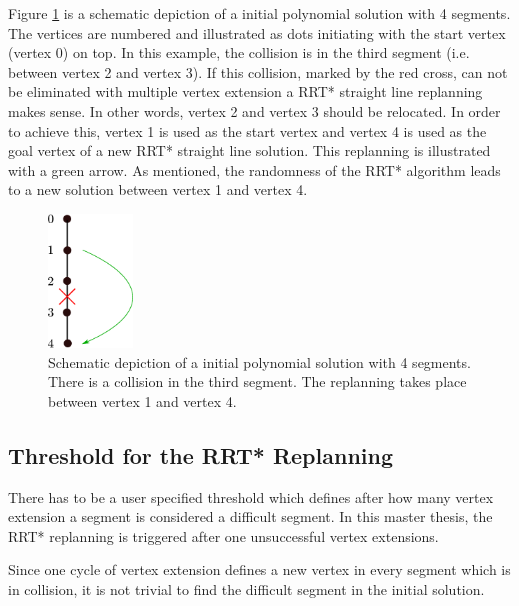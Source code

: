Figure \ref{pic:vertexExtensionRRT} is a schematic depiction of a initial polynomial solution with 4 segments. The vertices are numbered and illustrated as dots initiating with the start vertex (vertex 0) on top. In this example, the collision is in the third segment (i.e. between vertex 2 and vertex 3). If this collision, marked by the red cross, can not be eliminated with multiple vertex extension a RRT* straight line replanning makes sense. In other words, vertex 2 and vertex 3 should be relocated. 
In order to achieve this, vertex 1 is used as the start vertex and vertex 4 is used as the goal vertex of a new RRT* straight line solution. This replanning is illustrated with a green arrow. As mentioned, the randomness of the RRT* algorithm leads to a new solution between vertex 1 and vertex 4.


\begin{figure}[h]
   \centering
   \includegraphics[width=0.2\textwidth]{pics/vertexExtensionRRT.eps}
   \caption{Schematic depiction of a initial polynomial solution with 4 segments. There is a collision in the third segment. The replanning takes place between vertex 1 and vertex 4.}
   \label{pic:vertexExtensionRRT}
\end{figure}


\subsection{Threshold for the RRT* Replanning}\label{sec:RRTreplanning}

There has to be a user specified threshold which defines after how many vertex extension a segment is considered a difficult segment. In this master thesis, the RRT* replanning is triggered after one unsuccessful vertex extensions.\newline

Since one cycle of vertex extension defines a new vertex in every segment which is in collision, it is not trivial to find the difficult segment in the initial solution.

